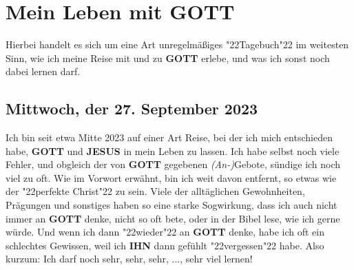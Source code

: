 \documentclass[10pt,a5paper]{article}
\newcommand{\Gott}[0]{\textbf{GOTT}}
\newcommand{\Ihn}[0]{\textbf{IHN}}
\newcommand{\Jesus}[0]{\textbf{JESUS}}
\newcommand{\q}[1]{\char"22{#1}\char"22 }
\begin{document}
	\newpage
	\section{Mein Leben mit {\Gott}} \label{MeinLebenMitGott}
		Hierbei handelt es sich um eine Art unregelm\"a{\ss}iges \q{Tagebuch} im weitesten Sinn,
		wie ich meine Reise mit und zu {\Gott} erlebe,
		und was ich sonst noch dabei lernen darf.
	
	\subsection{Mittwoch, der 27. September 2023}
		Ich bin seit etwa Mitte 2023 auf einer Art Reise,
		bei der ich mich entschieden habe,
		{\Gott} und {\Jesus} in mein Leben zu lassen.
		Ich habe selbst noch viele Fehler,
		und obgleich der von {\Gott} gegebenen \textit{(An-)}Gebote,
		s\"undige ich noch viel zu oft.
		Wie im Vorwort erw\"ahnt,
		bin ich weit davon entfernt,
		so etwas wie der \q{perfekte Christ} zu sein.
		Viele der allt\"aglichen Gewohnheiten,
		Pr\"agungen und sonstiges haben so eine starke Sogwirkung,
		dass ich auch nicht immer an {\Gott} denke,
		nicht so oft bete,
		oder in der Bibel lese,
		wie ich gerne w\"urde.
		Und wenn ich dann \q{wieder} an {\Gott} denke,
		habe ich oft ein schlechtes Gewissen,
		weil ich {\Ihn} dann gef\"uhlt \q{vergessen} habe.
		Also kurzum:
		Ich darf noch sehr, sehr, sehr, ..., sehr viel lernen!
		
\end{document}
